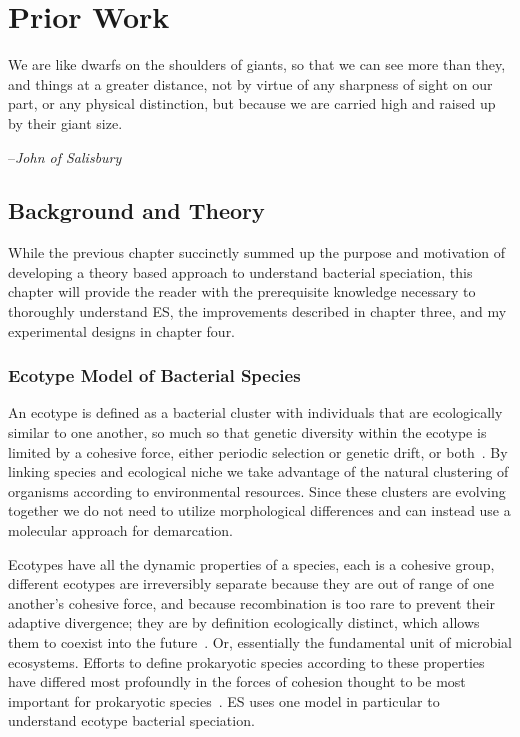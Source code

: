 \chapter{Prior Work}


\begin{shadequote}
We are like dwarfs on the shoulders of giants, so that we can see more than they, and things at a greater distance, not by virtue of any sharpness of sight on our part, or any physical distinction, but because we are carried high and raised up by their giant size.\par--\emph{John of Salisbury}
\end{shadequote}

\section{Background and Theory}
While the previous chapter succinctly summed up the purpose and motivation of developing a theory based approach to understand bacterial speciation, this chapter will provide the reader with the prerequisite knowledge necessary to thoroughly understand ES, the improvements described in chapter three, and my experimental designs in chapter four.

\subsection*{Ecotype Model of Bacterial Species}
An ecotype is defined as a bacterial cluster with individuals that are ecologically similar to one another, so much so that genetic diversity within the ecotype is limited by a cohesive force, either periodic selection or genetic drift, or both~\cite{cohan2007systematics}.
By linking species and ecological niche we take advantage of the natural clustering of organisms according to environmental resources.
Since these clusters are evolving together we do not need to utilize morphological differences and can instead use a molecular approach for demarcation.

Ecotypes have all the dynamic properties of a species, each is a cohesive group, different ecotypes are irreversibly separate because they are out of range of one another's cohesive force, and because recombination is too rare to prevent their adaptive divergence; they are by definition ecologically distinct, which allows them to coexist into the future~\cite{cohan2007systematics}.
Or, essentially the fundamental unit of microbial ecosystems.
Efforts to define prokaryotic species according to these properties have differed most profoundly in the forces of cohesion thought to be most important for prokaryotic species~\cite{cohan2008origins}.
ES uses one model in particular to understand ecotype bacterial speciation.

